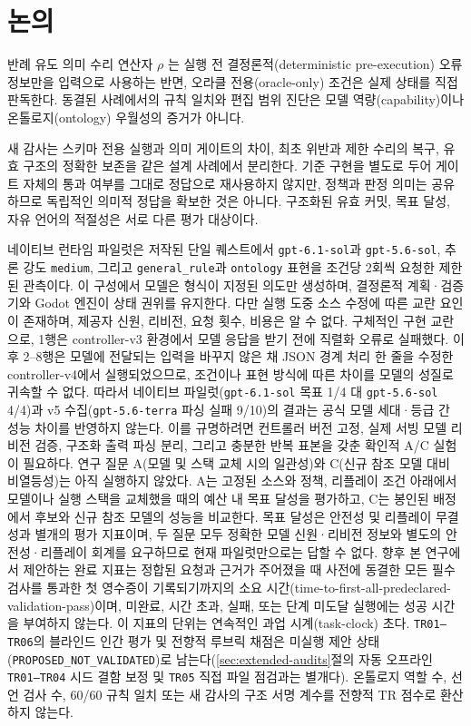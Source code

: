 \documentclass[journal]{IEEEtran}
\begin{document}
\section{논의}
반례 유도 의미 수리 연산자 $\rho$ \cite{S45_madaan2023selfrefine,S48_shinn2023reflexion,S46_chen2023selfdebug,S47_solarlezama2006sketching}는 실행 전 결정론적(deterministic pre-execution) 오류 정보만을 입력으로 사용하는 반면, 오라클 전용(oracle-only) 조건은 실제 상태를 직접 판독한다. 동결된 사례에서의 규칙 일치와 편집 범위 진단은 모델 역량(capability)이나 온톨로지(ontology) 우월성의 증거가 아니다.

새 감사는 스키마 전용 실행과 의미 게이트의 차이, 최초 위반과 제한 수리의 복구, 유효 구조의 정확한 보존을 같은 설계 사례에서 분리한다. 기준 구현을 별도로 두어 게이트 자체의 통과 여부를 그대로 정답으로 재사용하지 않지만, 정책과 판정 의미는 공유하므로 독립적인 의미적 정답을 확보한 것은 아니다. 구조화된 유효 커밋, 목표 달성, 자유 언어의 적절성은 서로 다른 평가 대상이다.

네이티브 런타임 파일럿은 저작된 단일 퀘스트에서 \texttt{gpt-6.1-sol}과 \texttt{gpt-5.6-sol}, 추론 강도 \texttt{medium}, 그리고 \texttt{general\_rule}과 \texttt{ontology} 표현을 조건당 2회씩 요청한 제한된 관측이다. 이 구성에서 모델은 형식이 지정된 의도만 생성하며, 결정론적 계획·검증기와 Godot 엔진이 상태 권위를 유지한다. 다만 실행 도중 소스 수정에 따른 교란 요인이 존재하며, 제공자 신원, 리비전, 요청 횟수, 비용은 알 수 없다.
구체적인 구현 교란으로, 1행은 controller-v3 환경에서 모델 응답을 받기 전에 직렬화 오류로 실패했다. 이후 2--8행은 모델에 전달되는 입력을 바꾸지 않은 채 JSON 경계 처리 한 줄을 수정한 controller-v4에서 실행되었으므로, 조건이나 표현 방식에 따른 차이를 모델의 성질로 귀속할 수 없다.
따라서 네이티브 파일럿(\texttt{gpt-6.1-sol} 목표 1/4 대 \texttt{gpt-5.6-sol} 4/4)과 v5 수집(\texttt{gpt-5.6-terra} 파싱 실패 9/10)의 결과는 공식 모델 세대·등급 간 성능 차이를 반영하지 않는다. 이를 규명하려면 컨트롤러 버전 고정, 실제 서빙 모델 리비전 검증, 구조화 출력 파싱 분리, 그리고 충분한 반복 표본을 갖춘 확인적 A/C 실험이 필요하다.
연구 질문 A(모델 및 스택 교체 시의 일관성)와 C(신규 참조 모델 대비 비열등성)는 아직 실행하지 않았다. A는 고정된 소스와 정책, 리플레이 조건 아래에서 모델이나 실행 스택을 교체했을 때의 예산 내 목표 달성을 평가하고, C는 봉인된 배정에서 후보와 신규 참조 모델의 성능을 비교한다. 목표 달성은 안전성 및 리플레이 무결성과 별개의 평가 지표이며, 두 질문 모두 정확한 모델 신원·리비전 정보와 별도의 안전성·리플레이 회계를 요구하므로 현재 파일럿만으로는 답할 수 없다. 향후 본 연구에서 제안하는 완료 지표는 정합된 요청과 근거가 주어졌을 때 사전에 동결한 모든 필수 검사를 통과한 첫 영수증이 기록되기까지의 소요 시간(time-to-first-all-predeclared-validation-pass)이며, 미완료, 시간 초과, 실패, 또는 단계 미도달 실행에는 성공 시간을 부여하지 않는다. 이 지표의 단위는 연속적인 과업 시계(task-clock) 초다.
\texttt{TR01--TR06}의 블라인드 인간 평가 및 전향적 루브릭 채점은 미실행 제안 상태(\texttt{PROPOSED\_NOT\_VALIDATED})로 남는다(\ref{sec:extended-audits}절의 자동 오프라인 \texttt{TR01--TR04} 시드 결함 보정 및 \texttt{TR05} 직접 파일 점검과는 별개다). 온톨로지 역할 수, 선언 검사 수, 60/60 규칙 일치 또는 새 감사의 구조 서명 계수를 전향적 TR 점수로 환산하지 않는다.
\end{document}
